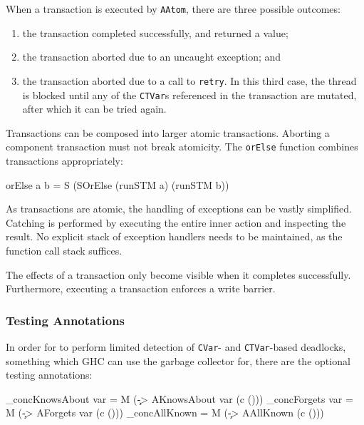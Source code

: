 When a transaction is executed by \verb|AAtom|, there are three
possible outcomes:

\begin{enumerate}
\item the transaction completed successfully, and returned a value;

\item the transaction aborted due to an uncaught exception; and

\item the transaction aborted due to a call to \verb|retry|. In this
  third case, the thread is blocked until any of the \verb|CTVar|s
  referenced in the transaction are mutated, after which it can be
  tried again.
\end{enumerate}

Transactions can be composed into larger atomic transactions. Aborting
a component transaction must not break atomicity. The \verb|orElse|
function combines transactions appropriately:

\begin{haskellcode}
orElse a b = S (SOrElse (runSTM a) (runSTM b))
\end{haskellcode}


As transactions are atomic, the handling of exceptions can be vastly
simplified. Catching is performed by executing the entire inner action
and inspecting the result. No explicit stack of exception handlers
needs to be maintained, as the function call stack suffices.

The effects of a transaction only become visible when it completes
successfully. Furthermore, executing a transaction enforces a write
barrier.

\subsubsection{Testing Annotations}
\label{sec:execution-primops-annotations}

In order for \dejafu{} to perform limited detection of \verb|CVar|-
and \verb|CTVar|-based deadlocks, something which GHC can use the
garbage collector for, there are the optional testing annotations:

\begin{haskellcode}
_concKnowsAbout var = M (\c -> AKnowsAbout var (c ()))
_concForgets    var = M (\c -> AForgets    var (c ()))
_concAllKnown       = M (\c -> AAllKnown       (c ()))
\end{haskellcode}

